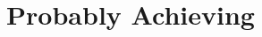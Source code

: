 \documentclass{article}
\begin{document}
\title{Probably Achieving}
\author{}
\date{}

\maketitle


\end{document}
